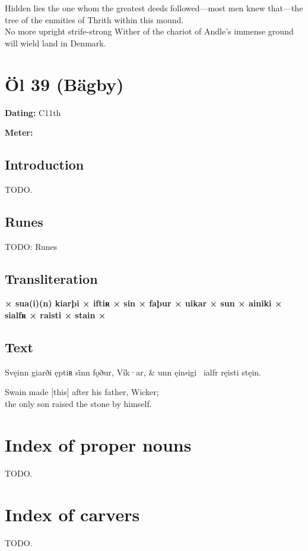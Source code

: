 \bvb Hidden lies the one whom the greatest deeds followed---most men knew that---the tree of the enmities of Thrith  within this mound. \\
No more upright strife-strong Wither of the chariot of Andle’s immense ground  will wield land in Denmark.\evb\evg

\sectionline\clearpage


\section{Öl 39 (Bägby)}

\begin{flushright}%
\textbf{Dating:} C11th

\textbf{Meter:} \Fornyrdislag
\end{flushright}%

\subsection{Introduction}

TODO.

\subsection{Runes}

TODO: Runes%

\subsection{Transliteration}

\textbf{× sua(i)(n) kiarþi × iftiʀ × sin × faþur × uikar × sun × ainiki × sialfʀ × raisti × stain ×}

\subsection{Text}

\bvg\bva[]%
Svęinn giarði ęptiʀ si̇nn fǫður, Vík·ar, &
unn ęin⸗igi \hld\ ialfr ręisti stęin.\eva

\bvb Swain made [this] after his father, Wicker; \\
the only son raised the stone by himself.\evb\evg

\sectionline\clearpage

\section{Index of proper nouns}

TODO.

\section{Index of carvers}

TODO.
